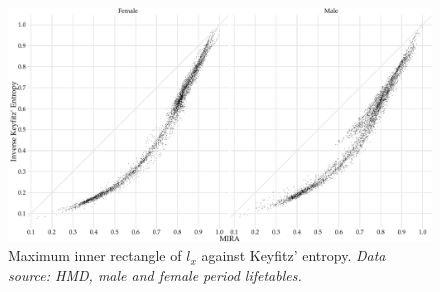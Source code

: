 \documentclass[
  10pt
]{scrartcl}
\begin{document}
\begin{figure}[ht!]
  \includegraphics[width = \linewidth]{../out/plot_mira_vs_keyfentr.pdf}
  \caption{Maximum inner rectangle of $l_x$ against Keyfitz' entropy. \emph{Data source: HMD, male and female period lifetables.}}
\end{figure}

\clearpage


\sloppy
\printbibliography




\end{document}
